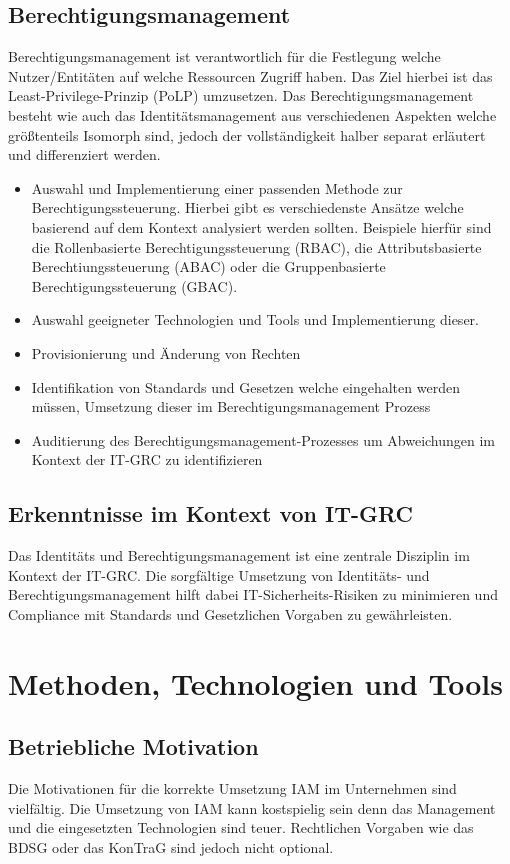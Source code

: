 \documentclass[11pt]{article}
\begin{document}
\subsection{Berechtigungsmanagement}
Berechtigungsmanagement ist verantwortlich für die Festlegung welche Nutzer/Entitäten auf welche Ressourcen Zugriff haben. Das Ziel hierbei ist das Least-Privilege-Prinzip (PoLP) umzusetzen. Das Berechtigungsmanagement besteht wie auch das Identitätsmanagement aus verschiedenen Aspekten welche größtenteils Isomorph sind, jedoch der vollständigkeit halber separat erläutert und differenziert werden.
\begin{itemize}
  \item Auswahl und Implementierung einer passenden Methode zur Berechtigungssteuerung. Hierbei gibt es verschiedenste Ansätze welche basierend auf dem Kontext analysiert werden sollten. Beispiele hierfür sind die Rollenbasierte Berechtigungssteuerung (RBAC), die Attributsbasierte Berechtiungssteuerung (ABAC) oder die Gruppenbasierte Berechtigungssteuerung (GBAC).
  \item Auswahl geeigneter Technologien und Tools und Implementierung dieser.
  \item Provisionierung und Änderung von Rechten
  \item Identifikation von Standards und Gesetzen welche eingehalten werden müssen, Umsetzung dieser im Berechtigungsmanagement Prozess
  \item Auditierung des Berechtigungsmanagement-Prozesses um Abweichungen im Kontext der IT-GRC zu identifizieren
\end{itemize}
\subsection{Erkenntnisse im Kontext von IT-GRC}
Das Identitäts und Berechtigungsmanagement ist eine zentrale Disziplin im Kontext der IT-GRC. Die sorgfältige Umsetzung von Identitäts- und Berechtigungsmanagement hilft dabei IT-Sicherheits-Risiken zu minimieren und Compliance mit Standards und Gesetzlichen Vorgaben zu gewährleisten.
\section{Methoden, Technologien und Tools}
\label{sec:existing}
\subsection{Betriebliche Motivation}
Die Motivationen für die korrekte Umsetzung IAM im Unternehmen sind vielfältig. Die Umsetzung von IAM kann kostspielig sein denn das Management und die eingesetzten Technologien sind teuer. Rechtlichen Vorgaben wie das BDSG oder das KonTraG sind jedoch nicht optional.
\end{document}
